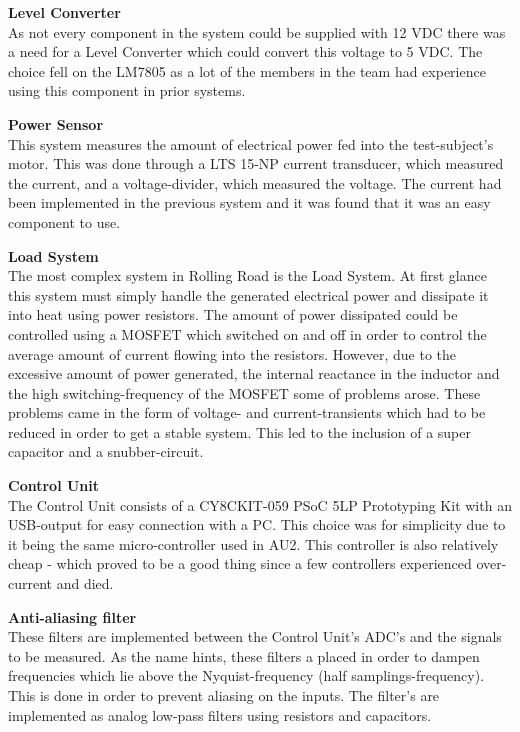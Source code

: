 \textbf{Level Converter}\\
As not every component in the system could be supplied with 12 VDC there was a need for a Level Converter which could convert this voltage to 5 VDC. The choice fell on the LM7805\cite{LM7805} as a lot of the members in the team had experience using this component in prior systems.

\textbf{Power Sensor}\\
This system measures the amount of electrical power fed into the test-subject's motor. This was done through a LTS 15-NP current transducer\cite{CurrentTransducer}, which measured the current, and a voltage-divider, which measured the voltage. The current had been implemented in the previous system and it was found that it was an easy component to use.

\textbf{Load System}\\
The most complex system in Rolling Road is the Load System. At first glance this system must simply handle the generated electrical power and dissipate it into heat using power resistors\cite{PowerResistor}. The amount of power dissipated could be controlled using a MOSFET\cite{IRFP260N} which switched on and off in order to control the average amount of current flowing into the resistors. However, due to the excessive amount of power generated, the internal reactance in the inductor and the high switching-frequency of the MOSFET some of problems arose. These problems came in the form of voltage- and current-transients which had to be reduced in order to get a stable system. This led to the inclusion of a super capacitor\cite{SuperCapacitor} and a snubber-circuit\cite{Snubber}.

\textbf{Control Unit}\\
The Control Unit consists of a CY8CKIT-059 PSoC 5LP Prototyping Kit with an USB-output for easy connection with a PC. This choice was for simplicity due to it being the same micro-controller used in AU2. This controller is also relatively cheap - which proved to be a good thing since a few controllers experienced over-current and died. 

\textbf{Anti-aliasing filter}\\
These filters are implemented between the Control Unit's ADC's and the signals to be measured. As the name hints, these filters a placed in order to dampen frequencies which lie above the Nyquist-frequency (half samplings-frequency). This is done in order to prevent aliasing on the inputs. The filter's are implemented as analog low-pass filters using resistors and capacitors. 

